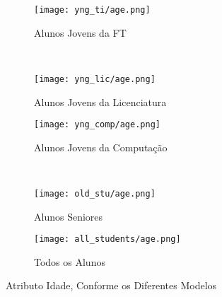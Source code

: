 

\clearpage
\begin{figure}[!ht]
    \centering
    \begin{subfigure}[b]{0.48\textwidth}
        \centering
        \texttt{[image: yng\_ti/age.png]}
        \caption{Alunos Jovens da FT}
    \end{subfigure}
    ~
    \begin{subfigure}[b]{0.48\textwidth}
        \centering
        \texttt{[image: yng\_lic/age.png]}
        \caption{Alunos Jovens da Licenciatura}
    \end{subfigure}

    \begin{subfigure}[b]{0.48\textwidth}
        \centering
        \texttt{[image: yng\_comp/age.png]}
        \caption{Alunos Jovens da Computação}
    \end{subfigure}
    ~
    \begin{subfigure}[b]{0.48\textwidth}
        \centering
        \texttt{[image: old\_stu/age.png]}
        \caption{Alunos Seniores}
    \end{subfigure}

    \begin{subfigure}[b]{0.48\textwidth}
        \centering
        \texttt{[image: all\_students/age.png]}
        \caption{Todos os Alunos}
    \end{subfigure}
    \caption{Atributo Idade, Conforme os Diferentes Modelos}
\end{figure}

